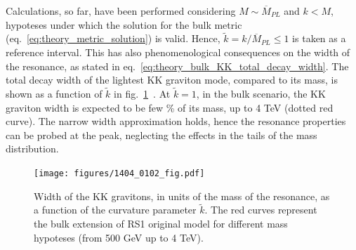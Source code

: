 Calculations, so far, have been performed considering $M \sim \overline{M}_{PL}$ and $k < M$, hypoteses under which the solution for the bulk metric (eq.~\ref{eq:theory_metric_solution}) is valid. Hence, $\tilde{k} = k / \overline{M}_{PL} \leq 1$ is taken as a reference interval. This has also phenomenological consequences on the width of the resonance, as stated in eq.~\ref{eq:theory_bulk_KK_total_decay_width}. The total decay width of the lightest KK graviton mode, compared to its mass, is shown as a function of $\tilde{k}$ in fig.~\ref{fig:theory_grav_width_vs_ktilda}~\cite{Oliveira:2014kla}. At $\tilde{k} = 1$, in the bulk scenario, the KK graviton width is expected to be few \% of its mass, up to 4 TeV (dotted red curve). The narrow width approximation holds, hence the resonance properties can be probed at the peak, neglecting the effects in the tails of the mass distribution.

\begin{figure}[!htb]
  \centering
    \texttt{[image: figures/1404\_0102\_fig.pdf]}
  \caption{Width of the KK gravitons, in units of the mass of the resonance, as a function of the curvature parameter $\tilde{k}$. The red curves represent the bulk extension of RS1 original model for different mass hypoteses (from 500 GeV up to 4 TeV).}
  \label{fig:theory_grav_width_vs_ktilda}
\end{figure}

